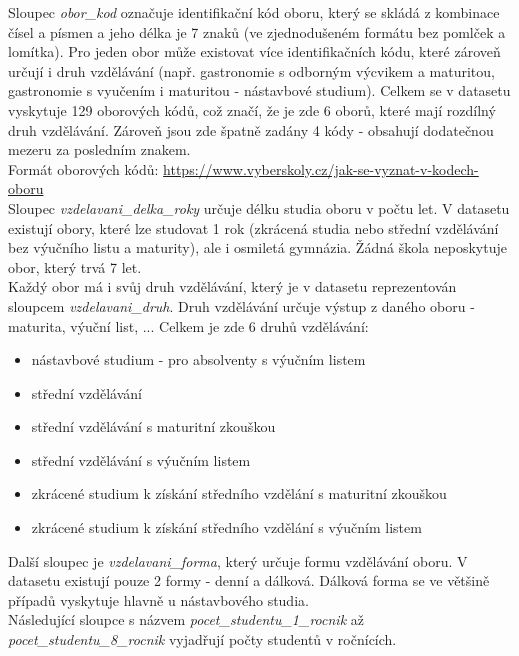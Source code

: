 \documentclass[12pt, a4paper]{article}
\begin{document}
Sloupec \textit{obor\_kod} označuje identifikační kód oboru, který se skládá z kombinace čísel a písmen a jeho délka je 7 znaků (ve zjednodušeném formátu bez pomlček a lomítka). Pro jeden obor může existovat více identifikačních kódu, které zároveň určují i druh vzdělávání  (např. gastronomie s odborným výcvikem a maturitou, gastronomie s vyučením i maturitou - nástavbové studium). Celkem se v datasetu vyskytuje 129 oborových kódů, což značí, že je zde 6 oborů, které mají rozdílný druh vzdělávání. Zároveň jsou zde špatně zadány 4 kódy - obsahují dodatečnou mezeru za posledním znakem. \\
\noindent Formát oborových kódů: \href{https://www.vyberskoly.cz/jak-se-vyznat-v-kodech-oboru}{https://www.vyberskoly.cz/jak-se-vyznat-v-kodech-oboru} \\

Sloupec \textit{vzdelavani\_delka\_roky} určuje délku studia oboru v počtu let. V datasetu existují obory, které lze studovat 1 rok (zkrácená studia nebo střední vzdělávání bez výučního listu a maturity), ale i osmiletá gymnázia. Žádná škola neposkytuje obor, který trvá 7 let. \\

Každý obor má i svůj druh vzdělávání, který je v datasetu reprezentován sloupcem \textit{vzdelavani\_druh}. Druh vzdělávání určuje výstup z daného oboru - maturita, výuční list, ... Celkem je zde 6 druhů vzdělávání:
\begin{itemize}
\item nástavbové studium - pro absolventy s výučním listem
\item střední vzdělávání
\item střední vzdělávání s maturitní zkouškou
\item střední vzdělávání s výučním listem
\item zkrácené studium k získání středního vzdělání s maturitní zkouškou
\item zkrácené studium k získání středního vzdělání s výučním listem\\
\end{itemize}

Další sloupec je \textit{vzdelavani\_forma}, který určuje formu vzdělávání oboru. V datasetu existují pouze 2 formy - denní a dálková. Dálková forma se ve většině případů vyskytuje hlavně u nástavbového studia. \\

Následující sloupce s názvem \textit{pocet\_studentu\_1\_rocnik} až \textit{pocet\_studentu\_8\_rocnik} vyjadřují počty studentů v ročnících. \\
\end{document}
